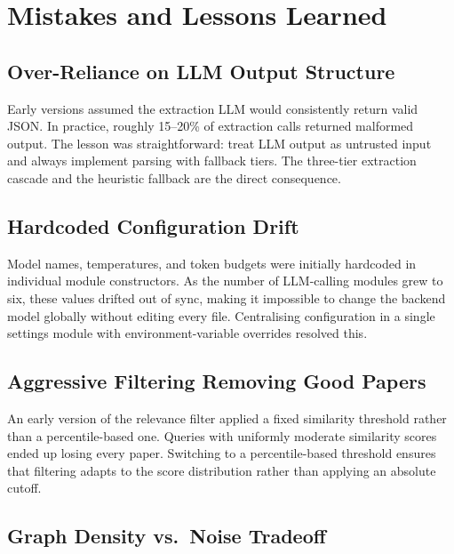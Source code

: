\documentclass[11pt,a4paper]{article}
\begin{document}
\section{Mistakes and Lessons Learned}

\subsection{Over-Reliance on LLM Output Structure}

Early versions assumed the extraction LLM would consistently return valid
JSON. In practice, roughly 15--20\% of extraction calls returned malformed
output. The lesson was straightforward: treat LLM output as untrusted input
and always implement parsing with fallback tiers. The three-tier extraction
cascade and the heuristic fallback are the direct consequence.

\subsection{Hardcoded Configuration Drift}

Model names, temperatures, and token budgets were initially hardcoded in
individual module constructors. As the number of LLM-calling modules grew to
six, these values drifted out of sync, making it impossible to change the
backend model globally without editing every file. Centralising configuration
in a single settings module with environment-variable overrides resolved
this.

\subsection{Aggressive Filtering Removing Good Papers}

An early version of the relevance filter applied a fixed similarity threshold
rather than a percentile-based one. Queries with uniformly moderate similarity
scores ended up losing every paper. Switching to a percentile-based threshold
ensures that filtering adapts to the score distribution rather than applying
an absolute cutoff.

\subsection{Graph Density vs.\ Noise Tradeoff}
\end{document}
